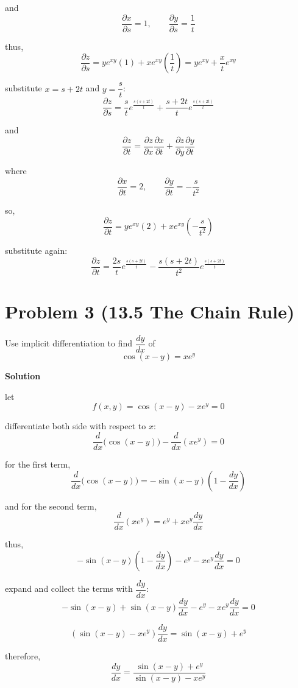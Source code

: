 \documentclass{article}
\newcommand{\solution}{\textbf{\large Solution}}
\theoremstyle{remark}
\begin{document}
and
\[
    \frac{\partial x}{\partial s} = 1, \qquad \frac{\partial y}{\partial s} = \frac{1}{t}
\]

thus,
\[
    \frac{\partial z}{\partial s} = ye^{xy}(1) + xe^{xy}\left(\frac{1}{t}\right)
    = ye^{xy} + \frac{x}{t}e^{xy}
\]

substitute $x = s+2t$ and $y = \dfrac{s}{t}$:
\[
    \boxed{\frac{\partial z}{\partial s} = \frac{s}{t}e^{\frac{s(s+2t)}{t}} + \frac{s+2t}{t}e^{\frac{s(s+2t)}{t}}}
\]

and
\[
    \frac{\partial z}{\partial t} = \frac{\partial z}{\partial x}\frac{\partial x}{\partial t} + \frac{\partial z}{\partial y}\frac{\partial y}{\partial t}
\]

where
\[
    \frac{\partial x}{\partial t} = 2, \qquad \frac{\partial y}{\partial t} = -\frac{s}{t^2}
\]

so,
\[
    \frac{\partial z}{\partial t} = ye^{xy}(2) + xe^{xy}\left(-\frac{s}{t^2}\right)
\]

substitute again:
\[
    \boxed{\frac{\partial z}{\partial t} = \frac{2s}{t}e^{\frac{s(s+2t)}{t}} - \frac{s(s+2t)}{t^2}e^{\frac{s(s+2t)}{t}}}
\]

\vspace{1em}
\hrulefill

\section*{Problem 3 (13.5 The Chain Rule)}
Use implicit differentiation to find $\dfrac{dy}{dx}$ of
\[
    \cos(x-y) = xe^y
\]

\medskip
\solution

let
\[
    f(x,y) = \cos(x-y) - xe^y = 0
\]

differentiate both side with respect to $x$:
\[
    \frac{d}{dx}\bigl(\cos(x-y)\bigr) - \frac{d}{dx}(xe^y) = 0
\]

for the first term,
\[
    \frac{d}{dx}\bigl(\cos(x-y)\bigr) = -\sin(x-y)\left(1-\frac{dy}{dx}\right)
\]

and for the second term,
\[
    \frac{d}{dx}(xe^y) = e^y + xe^y\frac{dy}{dx}
\]

thus,
\[
    -\sin(x-y)\left(1-\frac{dy}{dx}\right) - e^y - xe^y\frac{dy}{dx} = 0
\]

expand and collect the terms with $\dfrac{dy}{dx}$:
\[
    -\sin(x-y) + \sin(x-y)\frac{dy}{dx} - e^y - xe^y\frac{dy}{dx} = 0
\]

\[
    \left(\sin(x-y) - xe^y\right)\frac{dy}{dx} = \sin(x-y) + e^y
\]

therefore,
\[
    \boxed{\frac{dy}{dx} = \frac{\sin(x-y)+e^y}{\sin(x-y)-xe^y}}
\]
\end{document}
